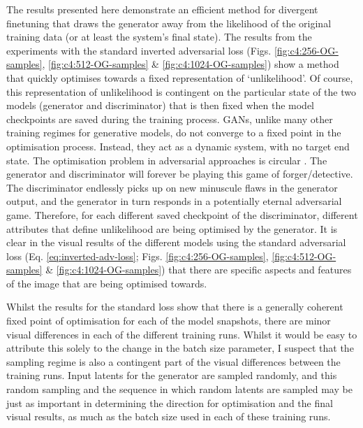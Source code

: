 The results presented here demonstrate an efficient method for divergent finetuning that draws the generator away from the likelihood of the original training data (or at least the system's final state). 
The results from the experiments with the standard inverted adversarial loss (Figs. \ref{fig:c4:256-OG-samples}, \ref{fig:c4:512-OG-samples} \& \ref{fig:c4:1024-OG-samples}) show a method that quickly optimises towards a fixed representation of `unlikelihood'.
Of course, this representation of unlikelihood is contingent on the particular state of the two models (generator and discriminator) that is then fixed when the model checkpoints are saved during the training process.
GANs, unlike many other training regimes for generative models,  do not converge to a fixed point in the optimisation process.
Instead, they act as a dynamic system, with no target end state. 
The optimisation problem in adversarial approaches is circular \citep{nagarajan2017gradient}. 
The generator and discriminator will forever be playing this game of forger/detective. 
The discriminator endlessly picks up on new minuscule flaws in the generator output, and the generator in turn responds in a potentially eternal adversarial game.
Therefore, for each different saved checkpoint of the discriminator, different attributes that define unlikelihood are being optimised by the generator.
It is clear in the visual results of the different models using the standard adversarial loss (Eq. \ref{eq:inverted-adv-loss}; Figs. \ref{fig:c4:256-OG-samples}, \ref{fig:c4:512-OG-samples} \& \ref{fig:c4:1024-OG-samples}) that there are specific aspects and features of the image that are being optimised towards. 

Whilst the results for the standard loss show that there is a generally coherent fixed point of optimisation for each of the model snapshots, there are minor visual differences in each of the different training runs.
Whilst it would be easy to attribute this solely to the change in the batch size parameter, I suspect that the sampling regime is also a contingent part of the visual differences between the training runs.
Input latents for the generator are sampled randomly, and this random sampling and the sequence in which random latents are sampled may be just as important in determining the direction for optimisation and the final visual results, as much as the batch size used in each of these training runs. 

